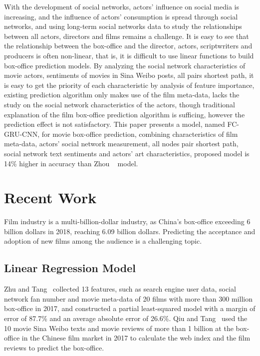 \documentclass[review]{cvpr}
\begin{document}
With the development of social networks, actors' influence on social media is increasing, and the influence of actors' consumption is spread through social networks,
and using long-term social networks data to study the relationships between all actors, directors and films remains a challenge.
It is easy to see that the relationship between the box-office and the director, actors, scriptwriters and producers is often non-linear, that is, it is difficult to use linear functions to build box-office prediction models.
By analyzing the social network characteristics of movie actors, sentiments of movies in Sina Weibo posts, all pairs shortest path, it is easy to get the priority of each characteristic by analysis of feature importance,
existing prediction algorithm only makes use of the film meta-data, lacks the study on the social network characteristics of the actors, though traditional explanation of the film box-office prediction algorithm is sufficing, however the prediction effect is not satisfactory.
This paper presents a model, named FC-GRU-CNN, for movie box-office prediction, combining characteristics of film meta-data, actors' social network measurement,
all nodes pair shortest path, social network text sentiments and actors' art characteristics, proposed model is 14\% higher in accuracy than Zhou \etal~\cite{zhou2015c} model.


\section{Recent Work}

Film industry is a multi-billion-dollar industry, as China's box-office exceeding 6 billion dollars in 2018, reaching 6.09 billion dollars.
Predicting the acceptance and adoption of new films among the audience is a challenging topic.

\subsection{Linear Regression Model}

Zhu and Tang~\cite{zhu2019film} collected 13 features, such as search engine user data, social network fan number and movie meta-data of 20 films with more than 300 million box-office in 2017,
and constructed a partial least-squared model with a margin of error of 87.7\% and an average absolute error of 26.6\%.
Qiu and Tang~\cite{qiu2018microblog} used the 10 movie Sina Weibo texts and movie reviews of more than 1 billion at the box-office in the Chinese film market in 2017 to calculate the web index and the film reviews to predict the box-office.
\end{document}

